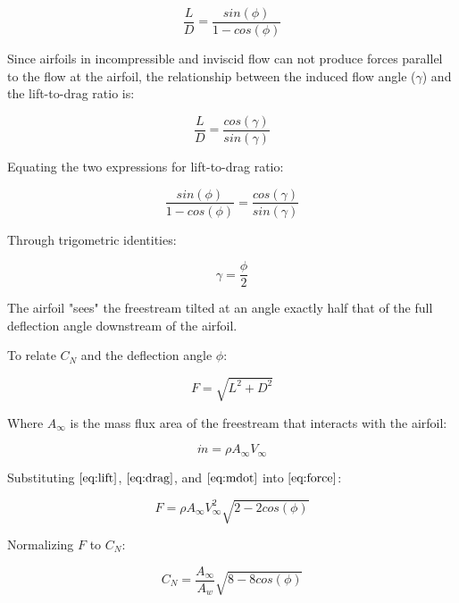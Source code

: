 \begin{equation}
\frac{L}{D} = \frac{sin(\phi)}{1 - cos(\phi)}
\end{equation}

Since airfoils in incompressible and inviscid flow can not produce forces parallel to the flow at the airfoil, the relationship between the induced flow angle (\(\gamma\)) and the lift-to-drag ratio is:

\begin{equation}
\frac{L}{D} = \frac{cos(\gamma)}{sin(\gamma)}
\end{equation}

Equating the two expressions for lift-to-drag ratio:

\begin{equation}
\frac{sin(\phi)}{1 - cos(\phi)}
    = \frac{cos(\gamma)}{sin(\gamma)}
\end{equation}

Through trigometric identities:

\begin{equation}
    \gamma = \frac{\phi}{2}
\end{equation}

The airfoil "sees" the freestream tilted at an angle exactly half that of the full deflection angle downstream of the airfoil.

To relate \(C_N\) and the deflection angle \(\phi\):

\begin{equation}
\label{eq:force}
    F = \sqrt{L^2 + D^2}
\end{equation}

Where \(A_\infty\) is the mass flux area of the freestream that interacts with the airfoil:

\begin{equation}
\label{eq:mdot}
    \dot{m} = \rho A_\infty V_\infty
\end{equation}

Substituting \(\eqref{eq:lift}\), \(\eqref{eq:drag}\), and \(\eqref{eq:mdot}\) into \(\eqref{eq:force}\):

\begin{equation}
    F = \rho A_\infty V_\infty^2 \sqrt{2 - 2 cos(\phi)}
\end{equation}

Normalizing \(F\) to \(C_N\):

\begin{equation}
    C_N = \frac{A_\infty} {A_w} \sqrt{8 - 8 cos(\phi)}
\end{equation}

